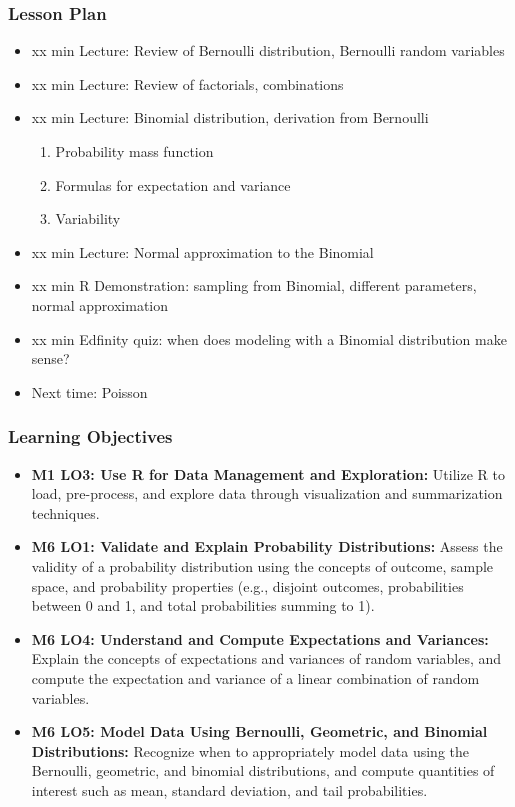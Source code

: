 \begin{frame}
    \frametitle{Lesson Plan}
    \begin{itemize}
        \item xx min Lecture: Review of Bernoulli distribution, Bernoulli random variables
        \item xx min Lecture: Review of factorials, combinations
        \item xx min Lecture: Binomial distribution, derivation from Bernoulli
        \begin{enumerate}
            \item Probability mass function
            \item Formulas for expectation and variance
            \item Variability
        \end{enumerate}
        \item xx min Lecture: Normal approximation to the Binomial
        \item xx min R Demonstration: sampling from Binomial, different parameters, normal approximation
        \item xx min Edfinity quiz: when does modeling with a Binomial distribution make sense?
        \item Next time: Poisson
    \end{itemize}
    \end{frame}
    
    \begin{frame}
    \frametitle{Learning Objectives}
    \begin{itemize}
        \item \textbf{M1 LO3: Use R for Data Management and Exploration:} Utilize R to load, pre-process, and explore data through visualization and summarization techniques.
        \item \textbf{M6 LO1: Validate and Explain Probability Distributions:} Assess the validity of a probability distribution using the concepts of outcome, sample space, and probability properties (e.g., disjoint outcomes, probabilities between 0 and 1, and total probabilities summing to 1).
        \item \textbf{M6 LO4: Understand and Compute Expectations and Variances:} Explain the concepts of expectations and variances of random variables, and compute the expectation and variance of a linear combination of random variables.
        \item \textbf{M6 LO5: Model Data Using Bernoulli, Geometric, and Binomial Distributions:} Recognize when to appropriately model data using the Bernoulli, geometric, and binomial distributions, and compute quantities of interest such as mean, standard deviation, and tail probabilities.
    \end{itemize}
\end{frame}


